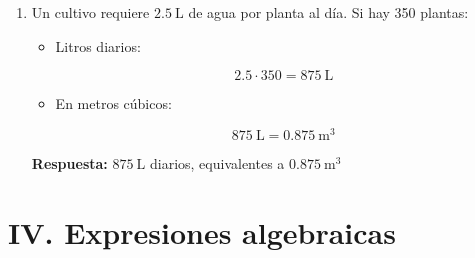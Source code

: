 \documentclass[12pt]{article}
\begin{document}
\begin{enumerate}[itemsep=0.6cm]
\begin{itemize}
			\[
			30\ \text{min} = 0.5\ \text{h}
			\]
			
			\[
			v = \frac{15}{0.5} = 30\ \text{km/h}
			\]
			
			\item Velocidad en m/s:
			
			\[
			30\ \text{km/h} = \frac{30000\ \text{m}}{3600\ \text{s}} = 8.33\ \text{m/s}
			\]
		\end{itemize}
		
		\textbf{Respuesta:} $30\ \text{km/h}$ y aproximadamente $8.33\ \text{m/s}$
		
		\item Un cultivo requiere $2.5\ \text{L}$ de agua por planta al día.  
		Si hay 350 plantas:
		
		\begin{itemize}
			\item Litros diarios:
			
			\[
			2.5 \cdot 350 = 875\ \text{L}
			\]
			
			\item En metros cúbicos:
			
			\[
			875\ \text{L} = 0.875\ \text{m}^3
			\]
		\end{itemize}
		
		\textbf{Respuesta:} $875\ \text{L}$ diarios, equivalentes a $0.875\ \text{m}^3$
	\end{enumerate}
	
		\newpage
	
	\vspace*{1em}		
	
	
	\section*{IV. Expresiones algebraicas}
	
\end{document}
